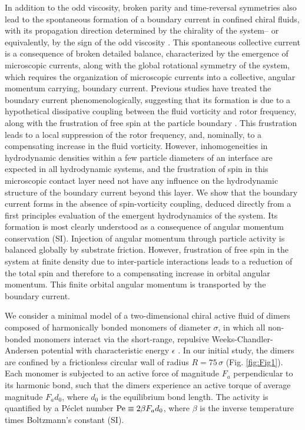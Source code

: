 \documentclass[%
 reprint,
superscriptaddress,
longbibliography,
 amsmath,amssymb,
 prl,
 citeautoscript,
]{revtex4-1}
\begin{document}
In addition to the odd viscosity, broken parity and time-reversal symmetries also lead to the spontaneous formation of a boundary current in confined chiral fluids, with its propagation direction determined by the chirality of the system-- or equivalently, by the sign of the odd viscosity \cite{waves_Kranthi, free_surface, lubensky_etaR6, crystal}. This spontaneous collective current is a consequence of broken detailed balance, characterized by the emergence of microscopic currents, along with the global rotational symmetry of the system, which requires the organization of microscopic currents into a collective, angular momentum carrying, boundary current. Previous studies have treated the boundary current phenomenologically, suggesting that its formation is due to a hypothetical dissipative coupling between the fluid vorticity and rotor frequency, along with the frustration of free spin at the particle boundary \cite{lubensky_etaR6, waves_Kranthi,free_surface,crystal}. This frustration leads to a local suppression of the rotor frequency, and, nominally, to a compensating increase in the fluid vorticity. However, inhomogeneities in hydrodynamic densities within a few particle diameters of an interface are expected in all hydrodynamic systems, and the frustration of spin in this microscopic contact layer need not have any influence on the hydrodynamic structure of the boundary current beyond this layer. We show that the boundary current forms in the absence of spin-vorticity coupling, deduced directly from a first principles evaluation of the emergent hydrodynamics of the system. Its formation is most clearly understood as a consequence of angular momentum conservation (SI). Injection of angular momentum through particle activity is balanced globally by substrate friction. However, frustration of free spin in the system at finite density due to inter-particle interactions leads to a reduction of the total spin and therefore to a compensating increase in orbital angular momentum. This finite orbital angular momentum is transported by the boundary current.

We consider a minimal model of a two-dimensional chiral active fluid of dimers \cite{Kranthi_hydro_eqns, Cory_MD, my_PRL} composed of harmonically bonded monomers of diameter $\sigma$, in which all non-bonded monomers interact via the short-range, repulsive Weeks-Chandler-Andersen potential with characteristic energy $\epsilon$ \cite{WCA}. In our initial study, the dimers are confined by a frictionless circular wall of radius $R = 75 \, \sigma$ (Fig. \ref{fig:Fig1}). Each monomer is subjected to an active force of magnitude $F_a$ perpendicular to its harmonic bond, such that the dimers experience an active torque of average magnitude $F_a d_0$, where $d_0$ is the equilibrium bond length. The activity is quantified by a P\'{e}clet number ${\rm Pe} \equiv 2 \beta F_a d_0$, where $\beta$ is the inverse temperature times Boltzmann's constant (SI). %
\end{document}
